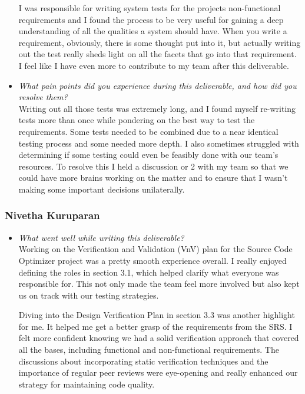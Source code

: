 \documentclass[12pt, titlepage]{article}
\begin{document}
\begin{appendices}
\begin{itemize}
        I was responsible for writing system tests for the projects
        non-functional requirements and I found the process to be
        very useful for gaining a deep understanding of all the
        qualities a system should have. When you write a requirement,
        obviously, there is some thought put into it, but actually
        writing out the test really sheds light on all the facets
        that go into that requirement. I feel like I have even more
        to contribute to my team after this deliverable.

      \item \textit{What pain points did you experience during this
        deliverable, and how did you resolve them?}\\

        Writing out all those tests was extremely long, and I found
        myself re-writing tests more than once while pondering on the
        best way to test the requirements. Some tests needed to be
        combined due to a near identical testing process and some
        needed more depth. I also sometimes struggled with
        determining if some testing could even be feasibly done with
        our team's resources. To resolve this I held a discussion or
        2 with my team so that we could have more brains working on
        the matter and to ensure that I wasn't making some important
        decisions unilaterally.
    \end{itemize}

    \subsubsection*{Nivetha Kuruparan}
    \begin{itemize}
      \item \textit{What went well while writing this deliverable?} \\

        Working on the Verification and Validation (VnV) plan for the
        Source Code Optimizer project was a pretty smooth experience
        overall. I really enjoyed defining the roles in section 3.1,
        which helped clarify what everyone was responsible for. This
        not only made the team feel more involved but also kept us on
        track with our testing strategies.

        Diving into the Design Verification Plan in section 3.3 was
        another highlight for me. It helped me get a better grasp of
        the requirements from the SRS. I felt more confident knowing
        we had a solid verification approach that covered all the
        bases, including functional and non-functional requirements.
        The discussions about incorporating static verification
        techniques and the importance of regular peer reviews were
        eye-opening and really enhanced our strategy for maintaining
        code quality.


\end{itemize}
\end{appendices}
\end{document}
